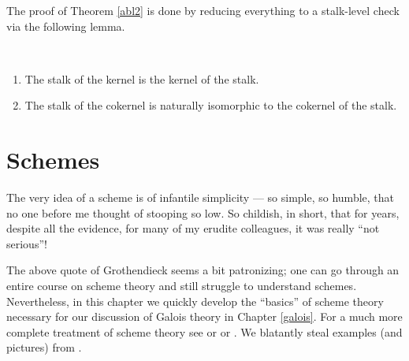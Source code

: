 \documentclass[11pt,openany]{book} %
\begin{document}
The proof of Theorem \ref{abl2} is done by reducing everything to a stalk-level check via the following lemma.\\

\begin{lemma}\
\begin{enumerate}[label=$\blacktriangleright$]
	\item The stalk of the kernel is the kernel of the stalk.
	\item The stalk of the cokernel is naturally isomorphic to the cokernel of the stalk.
\end{enumerate}
\end{lemma}


\chapter{Schemes} \label{schemes}

\begin{fquote}
The very idea of a scheme is of infantile simplicity --- so simple, so humble, that no one before me thought of stooping so low. So childish, in short, that for years, despite all the evidence, for many of my erudite colleagues, it was really ``not serious''!
\end{fquote}

The above quote of Grothendieck seems a bit patronizing; one can go through an entire course on scheme theory and still struggle to understand schemes. Nevertheless, in this chapter we quickly develop the ``basics'' of scheme theory necessary for our discussion of Galois theory in Chapter \ref{galois}. For a much more complete treatment of scheme theory see \cite{vakil} or \cite{hartshorne} or \cite{grothendiecksga}. We blatantly steal examples (and pictures) from \cite{vakil}.

\end{document}
